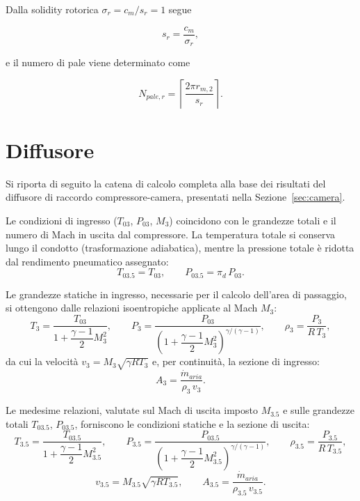 Dalla solidity rotorica $\sigma_r=c_m/s_r=1$ segue

\begin{equation*}
s_r=\frac{c_m}{\sigma_r},
\end{equation*}

e il numero di pale viene determinato come

\begin{equation*}
N_{pale,r}
=
\left\lceil
\frac{2\pi r_{m,2}}{s_r}
\right\rceil.
\end{equation*}


\section{Diffusore}
\label{app:diffusore}

Si riporta di seguito la catena di calcolo completa alla base dei risultati del diffusore di raccordo compressore-camera, presentati nella Sezione~\ref{sec:camera}.

Le condizioni di ingresso ($T_{03}$, $P_{03}$, $M_3$) coincidono con le grandezze totali e il numero di Mach in uscita dal compressore. La temperatura totale si conserva lungo il condotto (trasformazione adiabatica), mentre la pressione totale è ridotta dal rendimento pneumatico assegnato:
\begin{equation*}
    T_{03.5} = T_{03}, \qquad P_{03.5} = \pi_d\,P_{03}.
\end{equation*}

Le grandezze statiche in ingresso, necessarie per il calcolo dell'area di passaggio, si ottengono dalle relazioni isoentropiche applicate al Mach $M_3$:
\begin{equation*}
    T_3 = \frac{T_{03}}{1+\dfrac{\gamma-1}{2}M_3^2}, \qquad
    P_3 = \frac{P_{03}}{\left(1+\dfrac{\gamma-1}{2}M_3^2\right)^{\gamma/(\gamma-1)}}, \qquad
    \rho_3 = \frac{P_3}{R\,T_3},
\end{equation*}
da cui la velocità $v_3 = M_3\sqrt{\gamma R T_3}$ e, per continuità, la sezione di ingresso:
\begin{equation*}
    A_3 = \frac{\dot{m}_{aria}}{\rho_3\,v_3}.
\end{equation*}

Le medesime relazioni, valutate sul Mach di uscita imposto $M_{3.5}$ e sulle grandezze totali $T_{03.5}$, $P_{03.5}$, forniscono le condizioni statiche e la sezione di uscita:
\begin{equation*}
    T_{3.5} = \frac{T_{03.5}}{1+\dfrac{\gamma-1}{2}M_{3.5}^2}, \qquad
    P_{3.5} = \frac{P_{03.5}}{\left(1+\dfrac{\gamma-1}{2}M_{3.5}^2\right)^{\gamma/(\gamma-1)}}, \qquad
    \rho_{3.5} = \frac{P_{3.5}}{R\,T_{3.5}},
\end{equation*}
\begin{equation*}
    v_{3.5} = M_{3.5}\sqrt{\gamma R T_{3.5}}, \qquad A_{3.5} = \frac{\dot{m}_{aria}}{\rho_{3.5}\,v_{3.5}}.
\end{equation*}

